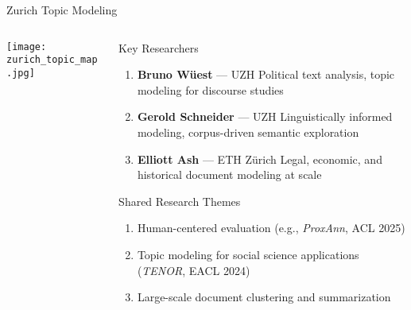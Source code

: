 \documentclass[compress]{beamer}
\begin{document}
\begin{frame}{Zurich Topic Modeling}
\begin{columns}
  \begin{column}{0.45\textwidth}
    \texttt{[image: zurich\_topic\_map.jpg]} %
  \end{column}
  \begin{column}{0.5\textwidth}
    \begin{block}{Key Researchers}
      \begin{enumerate}
        \item \textbf{Bruno Wüest} — UZH  
        Political text analysis, topic modeling for discourse studies

        \item \textbf{Gerold Schneider} — UZH  
        Linguistically informed modeling, corpus-driven semantic exploration

        \item \textbf{Elliott Ash} — ETH Zürich  
        Legal, economic, and historical document modeling at scale
      \end{enumerate}
    \end{block}

    \begin{block}{Shared Research Themes}
      \begin{enumerate}
        \item Human-centered evaluation (e.g., \textit{ProxAnn}, ACL 2025)
        \item Topic modeling for social science applications (\textit{TENOR}, EACL 2024)
        \item Large-scale document clustering and summarization
      \end{enumerate}
    \end{block}
  \end{column}
\end{columns}
\end{frame}
\end{document}
